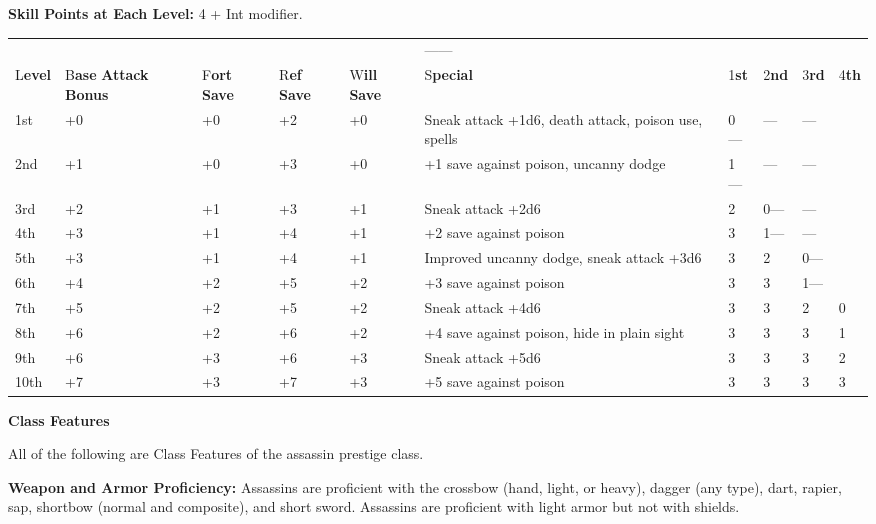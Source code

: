 \documentclass{article}
\begin{document}
\parindent=3pt
\textbf{Skill Points at Each Level:} 4 + Int modifier.

\vspace{12pt}
\parindent=0pt
\begin{tabular}{|>{\raggedright}p{17pt}|>{\raggedright}p{19pt}|>{\raggedright}p{13pt}|>{\raggedright}p{13pt}|>{\raggedright}p{13pt}|>{\raggedright}p{110pt}|>{\raggedright}p{10pt}|>{\raggedright}p{10pt}|>{\raggedright}p{10pt}|>{\raggedright}p{10pt}|}
\hline
\multicolumn{10}{|p{230pt}|}{T\textbf{able: The Assassin}}\tabularnewline
\hline
  &   &   &   &   &  ------ & \multicolumn{4}{p{42pt}|}{ \textbf{Spells per Day 
------}}\tabularnewline
\hline
L\textbf{evel} & B\textbf{ase}\linebreak{}
\textbf{Attack}\linebreak{}
\textbf{Bonus} & F\textbf{ort}\linebreak{}
\textbf{Save} & R\textbf{ef}\linebreak{}
\textbf{Save} & W\textbf{ill}\linebreak{}
\textbf{Save} & S\textbf{pecial} & 1\textbf{st} & 2\textbf{nd} & 3\textbf{rd} & 4\textbf{th}\tabularnewline
\hline
1st & +0 & +0 & +2 & +0 & Sneak attack +1d6, death attack, poison use, spells & 0--- & --- & --- & \tabularnewline
\hline
2nd & +1 & +0 & +3 & +0 & +1 save against poison, uncanny dodge & 1--- & --- & --- & \tabularnewline
\hline
3rd & +2 & +1 & +3 & +1 & Sneak attack +2d6 & 2 & 0--- & --- & \tabularnewline
\hline
4th & +3 & +1 & +4 & +1 & +2 save against poison & 3 & 1--- & --- & \tabularnewline
\hline
5th & +3 & +1 & +4 & +1 & Improved uncanny dodge, sneak attack +3d6 & 3 & 2 & 0--- & \tabularnewline
\hline
6th & +4 & +2 & +5 & +2 & +3 save against poison & 3 & 3 & 1--- & \tabularnewline
\hline
7th & +5 & +2 & +5 & +2 & Sneak attack +4d6 & 3 & 3 & 2 & 0\tabularnewline
\hline
8th & +6 & +2 & +6 & +2 & +4 save against poison, hide in plain sight & 3 & 3 & 3 & 1\tabularnewline
\hline
9th & +6 & +3 & +6 & +3 & Sneak attack +5d6 & 3 & 3 & 3 & 2\tabularnewline
\hline
10th & +7 & +3 & +7 & +3 & +5 save against poison & 3 & 3 & 3 & 3\tabularnewline
\hline
\end{tabular}

\vspace{12pt}
\textbf{Class Features}

All of the following are Class Features of the assassin prestige class.

\textbf{Weapon and Armor Proficiency:} Assassins are proficient with the crossbow 
(hand, light, or heavy), dagger (any type), dart, rapier, sap, shortbow (normal 
and composite), and short sword. Assassins are proficient with light armor but 
not with shields.
\end{document}
